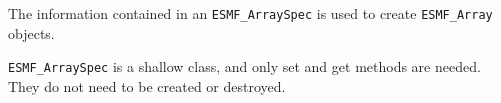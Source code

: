 
The information contained in an {\tt ESMF\_ArraySpec} is used to create 
{\tt ESMF\_Array} objects. 

{\tt ESMF\_ArraySpec} is a shallow class, and only set and get methods
are needed.  They do not need to be created or destroyed.

